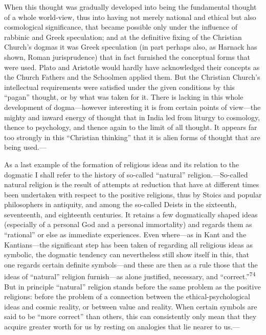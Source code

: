\documentclass[12pt,a4paper]{book}
\newcommand{\opage}[1]{\marginnote{\footnotesize\textit{[#1]}}}
\begin{document}
When this thought was gradually developed into being the fundamental thought of a whole world-view,
thus into having not merely national and ethical but also cosmological significance, that became
possible only under the influence of rabbinic and Greek speculation; and at the definitive fixing of
the Christian Church's dogmas it was Greek speculation (in part perhaps also, as Harnack has shown,
Roman jurisprudence) that in fact furnished the conceptual forms that were used. Plato and Aristotle
would hardly have acknowledged their concepts as the Church Fathers and the Schoolmen applied them.
But the Christian Church's intellectual requirements were satisfied under the given conditions by
this ``pagan'' thought, or by what was taken for it. There is lacking in this whole development of
dogma---however interesting it is from certain points of view---the mighty and inward energy of
thought that in India led from liturgy to cosmology, thence to psychology, and thence again to the
limit of all thought. It appears far too strongly in this ``Christian thinking'' that it is alien
forms of thought that are being used.---

As a last example of the formation of religious ideas and its relation to the dogmatic I shall refer
to the history of so-called ``natural'' religion.---So-called natural religion is the result of
attempts at reduction that have at different times been undertaken with respect to the positive
religions, thus by Stoics and popular philosophers in antiquity, and among the so-called Deists in
the sixteenth, seventeenth, and eighteenth centuries. It retains a few dogmatically shaped ideas
(especially of a personal God and a personal immortality) and regards them as ``rational'' or else as
immediate experiences. Even where---as in Kant 
\opage{144}and the Kantians---the significant step has been taken
of regarding all religious ideas as symbolic, the dogmatic tendency can nevertheless still show
itself in this, that one regards certain definite symbols---and these are then as a rule those that
the ideas of ``natural'' religion furnish---as alone justified, necessary, and
``correct.''\textsuperscript{74} But in principle ``natural'' religion stands before the same problem
as the positive religions: before the problem of a connection between the ethical-psychological ideas
and cosmic reality, or between value and reality. When certain symbols are said to be ``more correct''
than others, this can consistently only mean that they acquire greater worth for us by resting on
analogies that lie nearer to us.---
\end{document}
